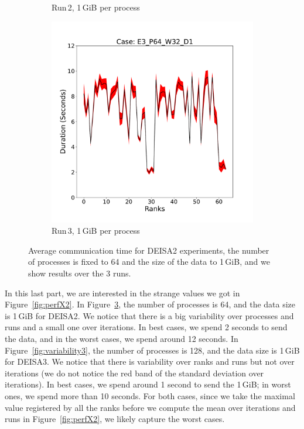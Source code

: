 \begin{figure}
\begin{subfigure}[b]{0.3\textwidth}
         \caption{Run\,2, 1\,GiB per process}
         \label{fig:E2_1_d22}
     \end{subfigure}
      \hfill
     \begin{subfigure}[b]{0.3\textwidth}
         \centering
         \includegraphics[width=\textwidth, height=\textwidth]{figures/deisa2__E3_P64_W32_D1.pdf}
         \caption{Run\,3, 1\,GiB per process}
         \label{fig:E3_1_d22}
     \end{subfigure}
        \caption{Average communication time for DEISA2 experiments, the number of processes is fixed to 64 and the size of the data to 1\,GiB, and we show results over the 3 runs.}
        \label{fig:variability222}
\end{figure}


In this last part, we are interested in the strange values we got in Figure~\ref{fig:perfX2}.
In Figure~\ref{fig:variability222}, the number of processes is 64, and the data size is 1\,GiB for DEISA2. We notice that there is a big variability over processes and runs and a small one over iterations. In best cases, we spend 2 seconds to send the data, and in the worst cases, we spend around 12 seconds.  
In Figure~\ref{fig:variability3}, the number of processes is 128, and the data size is 1\,GiB for DEISA3. We notice that there is variability over ranks and runs but not over iterations (we do not notice the red band of the standard deviation over iterations). In best cases, we spend around 1 second to send the 1\,GiB; in worst ones, we spend more than 10 seconds.
For both cases, since we take the maximal value registered by all the ranks before we compute the mean over iterations and runs in Figure~\ref{fig:perfX2}, we likely capture the worst cases. 


